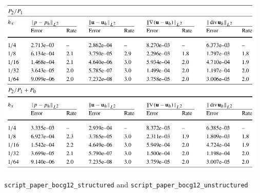 \begin{center}
\includegraphics[width=13cm]{python_codes/fieldstone_120/images/bocg12tab}
\end{center}

{\tt script\_paper\_bocg12\_structured} and {\tt script\_paper\_bocg12\_unstructured}

